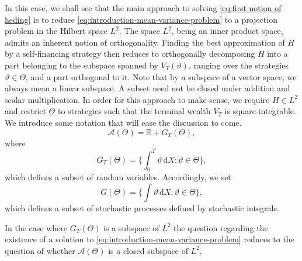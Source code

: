\documentclass[11pt,a4paper,twoside,openany]{report}
\numberwithin{equation}{section}
\newcommand{\diff}{\mathrm{d}}
\theoremstyle{plain} %
\theoremstyle{definition} %
\theoremstyle{remark} %
\begin{document}
In this case, we shall see that the main approach to solving \eqref{eq:first notion of heding} is to reduce \eqref{eq:introduction-mean-variance-problem} to a projection problem in the Hilbert space \(L^2\). The space \(L^2\), being an inner product space, admits an inherent notion of orthogonality. Finding the best approximation of \(H\) by a self-financing strategy  then reduces to orthogonally decomposing \(H\) into a part belonging to the subspace spanned by \(V_T(\vartheta)\), ranging over the strategies \(\vartheta\in\Theta\), and a part orthogonal to it. Note that by a subspace of a vector space, we always mean a linear subspace. A subset need not be closed under addition and scalar multiplication. In order for this approach to make sense, we require \(H\in L^2\) and restrict \(\Theta\) to strategies such that the terminal wealth \(V_T\) is square-integrable. We introduce some notation that will ease the discussion to come. 
\begin{equation*}
    \mathcal{A}(\Theta)=\mathbb{R}+G_T(\Theta) ,
\end{equation*}
where 
\begin{equation*}
    G_T(\Theta)=\{\int_0^{T}\vartheta\,\diff X:\vartheta\in\Theta\},
\end{equation*}
which defines a subset of random variables. Accordingly, we set 
\begin{equation*}
    G(\Theta)=\{\int\vartheta\,\diff X:\vartheta\in\Theta\},
\end{equation*}
which defines a subset of stochastic processes defined by stochastic integrals.

In the case where \(G_T(\Theta)\) is a subspace of \(L^2\) the question regarding the existence of a solution to \eqref{eq:introduction-mean-variance-problem} reduces to the question of whether \( \mathcal{A}(\Theta)\) is a closed subspace of \(L^2\). 
\end{document}
